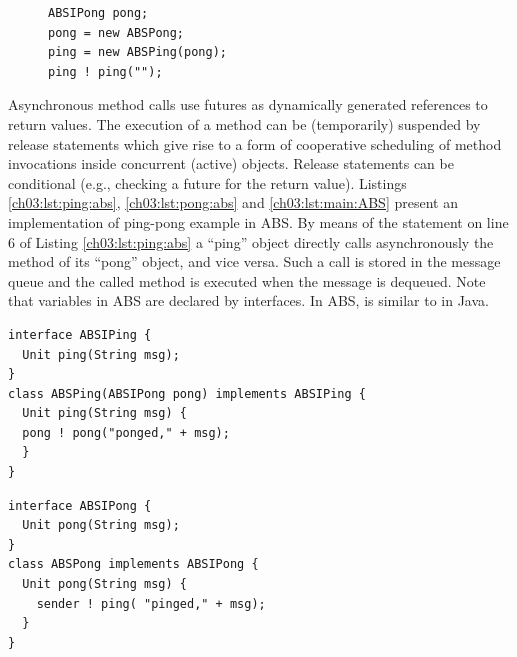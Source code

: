 \lstset{language=Java}
\begin{figure}[h]
\begin{lstlisting}[caption=main in ABS,label=ch03:lst:main:ABS]
ABSIPong pong;
pong = new ABSPong;
ping = new ABSPing(pong);
ping ! ping("");
\end{lstlisting}
\end{figure}

Asynchronous method calls use futures as dynamically generated references  to return values.
The execution of a method can be (temporarily) suspended by release statements which give rise to a form
of  cooperative scheduling of method invocations inside concurrent (active) objects.
Release statements can be conditional (e.g., checking a future for the return value).
Listings \ref{ch03:lst:ping:abs}, \ref{ch03:lst:pong:abs} and \ref{ch03:lst:main:ABS} present an implementation of ping-pong example in ABS.
By means of the statement on line 6 of Listing \ref{ch03:lst:ping:abs}
a ``ping'' object  directly calls asynchronously the  method  of its ``pong'' object, and vice versa.
Such a call is stored in the message queue and the called method is executed when the message is dequeued.
Note that variables in ABS are declared by interfaces.
In ABS,  is similar to  in Java.

\lstset{language=abs}
\begin{center}
\begin{minipage}[t]{0.48\textwidth}
\begin{lstlisting}[caption=Ping in ABS,label=ch03:lst:ping:abs]
interface ABSIPing {
  Unit ping(String msg);
}
class ABSPing(ABSIPong pong) implements ABSIPing {
  Unit ping(String msg) {
  pong ! pong("ponged," + msg);
  }
}
\end{lstlisting}
\end{minipage}
\hfill
\begin{minipage}[t]{0.48\textwidth}
\begin{lstlisting}[caption=Pong in ABS,label=ch03:lst:pong:abs]
interface ABSIPong {
  Unit pong(String msg);
}
class ABSPong implements ABSIPong {
  Unit pong(String msg) {
    sender ! ping( "pinged," + msg);
  }
}
\end{lstlisting}
\end{minipage}
\end{center}
\lstset{language=Java}

